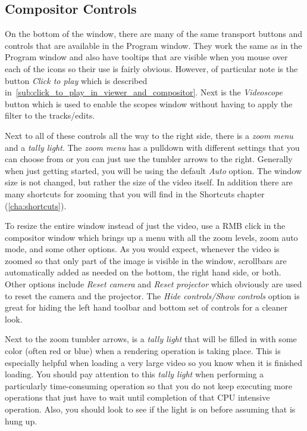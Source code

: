 \subsection{Compositor Controls}%
\label{sub:compositor_controls}

On the bottom of the window, there are many
of the same transport buttons and controls that are available in the Program window.
They work the same as in the Program window and also have tooltips that are visible 
when you mouse over each of the icons so their use is fairly obvious.  However,
of particular note is the button \textit{Click to play} which is described in~\ref{sub:click_to_play_in_viewer_and_compositor}.  Next is the \textit{Videoscope} button which is used to enable the scopes window
without having to apply the filter to the tracks/edits.

Next to all of these controls all the way to the right side, there is a \textit{zoom menu} and a \textit{tally light}.  The \textit{zoom menu} has a pulldown with different settings that you can choose from
or you can just use the tumbler arrows to the right. Generally when just getting started, you
will be using the default \textit{Auto} option.  The window size is not changed, but rather
the size of the video itself. In addition there are many shortcuts for zooming that you
will find in the Shortcuts chapter (\ref{cha:shortcuts}).

To resize the entire window instead of just the video, use a RMB click in the compositor
window which brings up a menu with all the zoom levels, zoom auto mode, and some other options. 
As you would expect, whenever the video is zoomed so that only part of the image is visible
in the window, scrollbars are automatically added as needed on the bottom, the right hand 
side, or both.
Other options include \emph{Reset camera} and \emph{Reset projector} which obviously are used
to reset the camera and the projector. 
The \emph{Hide controls/Show controls} option is great for hiding the left hand toolbar and
bottom set of controls for a cleaner look. 

Next to the zoom tumbler arrows, is a \textit{tally light} that will be filled in with some color
(often red or blue) when a rendering operation
is taking place. This is especially helpful when loading a very large video so you know
when it is finished loading.  You should pay attention to this \textit{tally light} when performing
a particularly time-consuming operation so that you do not keep executing more operations
that just have to wait until completion of that CPU intensive operation.  Also, you should look
to see if the light is on before assuming that \CGG{} is hung up.

